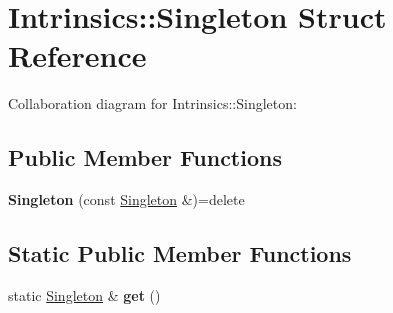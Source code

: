 \hypertarget{struct_intrinsics_1_1_singleton}{}\section{Intrinsics\+:\+:Singleton Struct Reference}
\label{struct_intrinsics_1_1_singleton}


Collaboration diagram for Intrinsics\+:\+:Singleton\+:
\subsection*{Public Member Functions}
\begin{DoxyCompactItemize}
\item 
\mbox{\label{struct_intrinsics_1_1_singleton_a4110f0431154c6a95ba2a78c78462840}} 
{\bfseries Singleton} (const \mbox{\hyperlink{struct_intrinsics_1_1_singleton}{Singleton}} \&)=delete
\end{DoxyCompactItemize}
\subsection*{Static Public Member Functions}
\begin{DoxyCompactItemize}
\item 
\mbox{\label{struct_intrinsics_1_1_singleton_a3dc19dbd3c766a1e45d3faa0418d3248}} 
static \mbox{\hyperlink{struct_intrinsics_1_1_singleton}{Singleton}} \& {\bfseries get} ()
\end{DoxyCompactItemize}
